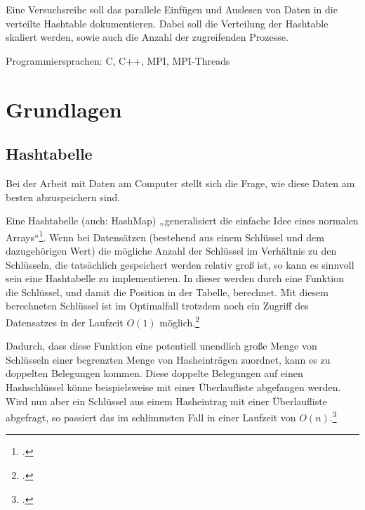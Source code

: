 \documentclass{scrreprt}
\begin{document}
Eine Versuchsreihe soll das parallele Einfügen und Auslesen von Daten in die verteilte Hashtable dokumentieren. Dabei soll die Verteilung der Hashtable skaliert werden, sowie auch die Anzahl der zugreifenden Prozesse.

Programmiersprachen: C, C++, MPI, MPI-Threads


\chapter{Grundlagen}

\section{Hashtabelle}
\label{sec:hashtable}
Bei der Arbeit mit Daten am Computer stellt sich die Frage, wie diese Daten am besten abzuspeichern sind. 

Eine Hashtabelle (auch: HashMap) „generalisiert die einfache Idee eines normalen Arrays“\footcite{cormen2009introduction}. Wenn bei Datensätzen (bestehend aus einem Schlüssel und dem dazugehörigen Wert) die mögliche Anzahl der Schlüssel im Verhältnis zu den Schlüsseln, die tatsächlich gespeichert werden relativ groß ist, so kann es sinnvoll sein eine Hashtabelle zu implementieren. In dieser werden durch eine Funktion die Schlüssel, und damit die Position in der Tabelle, berechnet. Mit diesem berechneten Schlüssel ist im Optimalfall trotzdem noch ein Zugriff des Datensatzes in der Laufzeit $O(1)$ möglich.\footcite{cormen2009introduction}

Dadurch, dass diese Funktion eine potentiell unendlich große Menge von Schlüsseln einer begrenzten Menge von Hasheinträgen zuordnet, kann es zu doppelten Belegungen kommen. Diese doppelte Belegungen auf einen Hashschlüssel könne beispielsweise mit einer Überlaufliste abgefangen werden. Wird nun aber ein Schlüssel aus einem Hasheintrag mit einer Überlaufliste abgefragt, so passiert das im schlimmsten Fall in einer Laufzeit von $O(n)$.\footcite{cormen2009introduction}
\end{document}
